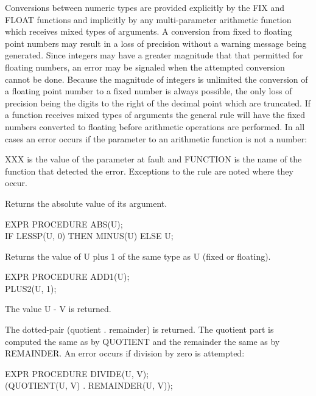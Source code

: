 \documentclass[11pt,letterpaper]{book}
\begin{document}
Conversions between numeric types are provided explicitly by the
 
FIX and FLOAT functions and implicitly by any multi-parameter
arithmetic function which receives mixed types of arguments. A
conversion from fixed to floating point numbers may result in a loss
of precision without a warning message being generated. Since
integers may have a greater magnitude that that permitted for floating
numbers, an error may be signaled when the attempted conversion cannot
be done. Because the magnitude of integers is unlimited the conversion
of a floating point number to a fixed number is always possible, the
only loss of precision being the digits to the right of the decimal
point which are truncated. If a function receives mixed types of
arguments the general rule will have the fixed numbers converted to
floating before arithmetic operations are performed. In all cases an
error occurs if the parameter to an arithmetic function is not a
number:


XXX is the value of the parameter at fault and FUNCTION is the name of
the function that detected the error. Exceptions to the rule are noted
where they occur.




{Returns the absolute value of its argument.

{\tt \begin{tabbing} EXPR PROCEDURE ABS(U); \\
\hspace*{1em} IF LESSP(U, 0) THEN MINUS(U) ELSE U;
\end{tabbing}}}

{Returns the value of U plus 1 of the same type as U (fixed or
floating).

{\tt \begin{tabbing} EXPR PROCEDURE ADD1(U); \\
\hspace{1em} PLUS2(U, 1);
\end{tabbing}}
}

{The value U - V is returned.}


{The dotted-pair (quotient . remainder) is returned. The quotient part
is computed the same as by QUOTIENT and the remainder the same as by
REMAINDER. An error occurs if division by zero is attempted:


{\tt \begin{tabbing} EXPR PROCEDURE DIVIDE(U, V); \\
\hspace*{1em} (QUOTIENT(U, V) . REMAINDER(U, V));
\end{tabbing}}}
\end{document}

